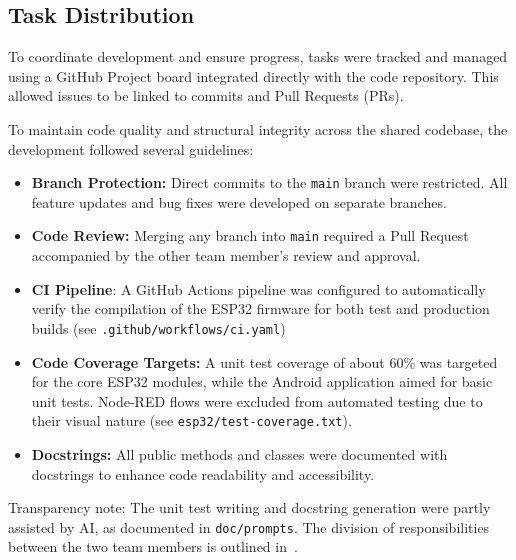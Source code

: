 \subsection{Task Distribution}
\label{subsec:task_distribution}

To coordinate development and ensure progress, tasks were tracked and managed using a GitHub Project board integrated directly with the code repository. This allowed issues to be linked to commits and Pull Requests (PRs).

To maintain code quality and structural integrity across the shared codebase, the development followed several guidelines:

\begin{itemize}
    \item \textbf{Branch Protection:} Direct commits to the \texttt{main} branch were restricted. All feature updates and bug fixes were developed on separate branches.
    \item \textbf{Code Review:} Merging any branch into \texttt{main} required a Pull Request accompanied by the other team member's review and approval.
    \item \textbf{CI Pipeline}: A GitHub Actions pipeline was configured to automatically verify the compilation of the ESP32 firmware for both test and production builds (see \texttt{.github/workflows/ci.yaml})
    \item \textbf{Code Coverage Targets:} A unit test coverage of about 60\% was targeted for the core ESP32 modules, while the Android application aimed for basic unit tests. Node-RED flows were excluded from automated testing due to their visual nature (see \texttt{esp32/test-coverage.txt}).
    \item \textbf{Docstrings:} All public methods and classes were documented with docstrings to enhance code readability and accessibility.
\end{itemize}

Transparency note: The unit test writing and docstring generation were partly assisted by AI, as documented in \texttt{doc/prompts}.
The division of responsibilities between the two team members is outlined in~.

